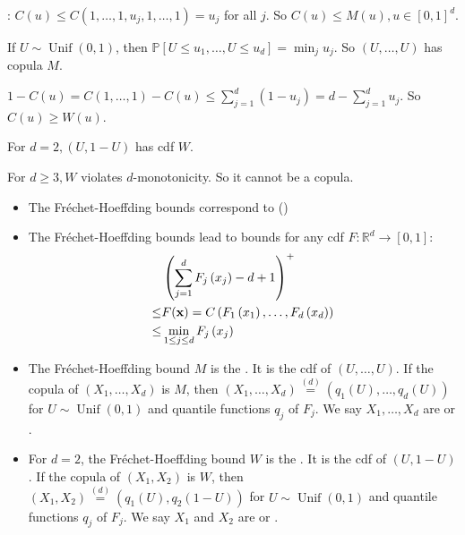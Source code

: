 : 
$C(u) \leq C\left(1, \ldots, 1, u_{j}, 1, \ldots, 1\right)=u_{j}$ for all $j$. So $C(u) \leq M(u), u \in[0,1]^{d}$.

If $U \sim \operatorname{Unif}(0,1)$, then $\mathbb{P}\left[U \leq u_{1}, \ldots, U \leq u_{d}\right]=\min _{j} u_{j}$. So $(U, \ldots, U)$ has copula $M$.

$1-C(u)=C(1, \ldots, 1)-C(u) \leq \sum_{j=1}^{d}\left(1-u_{j}\right)=d-\sum_{j=1}^{d} u_{j}$. So $C(u) \geq W(u)$.

For $d=2,(U, 1-U)$ has cdf $W$.

For $d \geq 3, W$ violates $d$-monotonicity. So it cannot be a copula.



\begin{itemize}[leftmargin=*]
    \item The Fréchet-Hoeffding bounds correspond to  ()
    \item The Fréchet-Hoeffding bounds lead to bounds for any cdf $F: \mathbb{R}^{d} \rightarrow[0,1]$:
$$
\begin{aligned}
&\left(\sum_{j=1}^{d} F_{j}\left(x_{j}\right)-d+1\right)^{+}\\
\leq& F(\operatorname{\boldsymbol{\mathbf{x}}})=C\left(F_{1}\left(x_{1}\right), \ldots, F_{d}\left(x_{d}\right)\right)\\
\leq& \min _{1 \leq j \leq d} F_{j}\left(x_{j}\right)
\end{aligned}
$$


    \item The Fréchet-Hoeffding bound $M$ is the . It is the cdf of $(U, \ldots, U)$.
If the copula of $\left(X_{1}, \ldots, X_{d}\right)$ is $M$, then $\left(X_{1}, \ldots, X_{d}\right) \stackrel{(d)}{=}\left(q_{1}(U), \ldots, q_{d}(U)\right)$
for $U \sim \operatorname{Unif}(0,1)$ and quantile functions $q_{j}$ of $F_{j}$.
We say $X_{1}, \ldots, X_{d}$ are  or .
    \item For $d=2$, the Fréchet-Hoeffding bound $W$ is the .
It is the cdf of $(U, 1-U)$. If the copula of $\left(X_{1}, X_{2}\right)$ is $W$, then $\left(X_{1}, X_{2}\right) \stackrel{(d)}{=}\left(q_{1}(U), q_{2}(1-U)\right)$ for $U \sim \operatorname{Unif}(0,1)$ and quantile functions $q_{j}$ of $F_{j}$.
We say $X_{1}$ and $X_{2}$ are  or .
\end{itemize}








